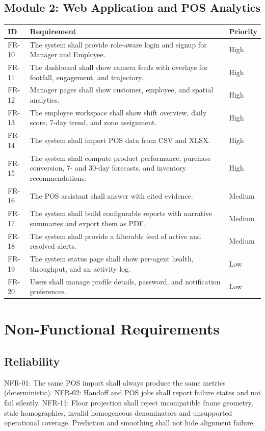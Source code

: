 \subsection{Module 2: Web Application and POS Analytics}
\begin{longtable}{P{0.1\textwidth}P{0.62\textwidth}P{0.15\textwidth}}
\toprule
ID & Requirement & Priority\\
\midrule
\endhead
FR-10 & The system shall provide role-aware login and signup for Manager and Employee. & High\\
FR-11 & The dashboard shall show camera feeds with overlays for footfall, engagement, and trajectory. & High\\
FR-12 & Manager pages shall show customer, employee, and spatial analytics. & High\\
FR-13 & The employee workspace shall show shift overview, daily score, 7-day trend, and zone assignment. & High\\
FR-14 & The system shall import POS data from CSV and XLSX. & High\\
FR-15 & The system shall compute product performance, purchase conversion, 7- and 30-day forecasts, and inventory recommendations. & High\\
FR-16 & The POS assistant shall answer with cited evidence. & Medium\\
FR-17 & The system shall build configurable reports with narrative summaries and export them as PDF. & Medium\\
FR-18 & The system shall provide a filterable feed of active and resolved alerts. & Medium\\
FR-19 & The system status page shall show per-agent health, throughput, and an activity log. & Low\\
FR-20 & Users shall manage profile details, password, and notification preferences. & Low\\
\bottomrule
\end{longtable}

\section{Non-Functional Requirements}
\subsection{Reliability}
NFR-01: The same POS import shall always produce the same metrics (deterministic). NFR-02: Handoff and POS jobs shall report failure states and not fail silently. NFR-11: Floor projection shall reject incompatible frame geometry, stale homographies, invalid homogeneous denominators and unsupported operational coverage. Prediction and smoothing shall not hide alignment failure.
